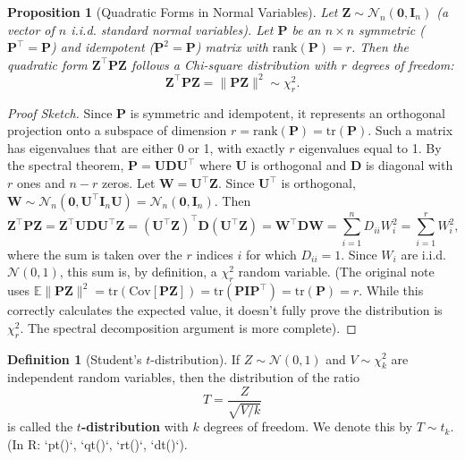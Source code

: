 \documentclass[11pt, letterpaper]{article}
\theoremstyle{plain} %
\newtheorem{proposition}[theorem]{Proposition}
\theoremstyle{definition} %
\newtheorem{definition}[theorem]{Definition}
\theoremstyle{remark} %
\renewcommand{\mathbf}{\boldsymbol} %
\newcommand{\E}{\mathbb{E}}
\newcommand{\Cov}{\mathrm{Cov}} %
\newcommand{\tr}{\mathrm{tr}}
\newcommand{\rank}{\mathrm{rank}}
\newcommand{\Normal}{\mathcal{N}}
\newcommand{\Chisq}{\chi^2}
\newcommand{\Tdist}{t}
\newcommand{\I}{\mathbf{I}} %
\begin{document}
\begin{proposition}[Quadratic Forms in Normal Variables] \label{prop:quadratic_form_chisq}
Let $\boldsymbol{Z} \sim \Normal_n(\mathbf{0}, \I_n)$ (a vector of $n$ i.i.d. standard normal variables). Let $\boldsymbol{P}$ be an $n \times n$ symmetric ($\boldsymbol{P}^{\top} = \boldsymbol{P}$) and idempotent ($\boldsymbol{P}^2 = \boldsymbol{P}$) matrix with $\rank(\boldsymbol{P}) = r$. Then the quadratic form $\boldsymbol{Z}^{\top}\boldsymbol{P}\boldsymbol{Z}$ follows a Chi-square distribution with $r$ degrees of freedom:
\[
\boldsymbol{Z}^{\top}\boldsymbol{P}\boldsymbol{Z} = \|\boldsymbol{P}\boldsymbol{Z}\|^2 \sim \Chisq_r.
\]
\end{proposition}
\begin{proof}[Proof Sketch]
Since $\boldsymbol{P}$ is symmetric and idempotent, it represents an orthogonal projection onto a subspace of dimension $r = \rank(\boldsymbol{P}) = \tr(\boldsymbol{P})$. Such a matrix has eigenvalues that are either 0 or 1, with exactly $r$ eigenvalues equal to 1. By the spectral theorem, $\boldsymbol{P} = \boldsymbol{U}\boldsymbol{D}\boldsymbol{U}^{\top}$ where $\boldsymbol{U}$ is orthogonal and $\boldsymbol{D}$ is diagonal with $r$ ones and $n-r$ zeros. Let $\boldsymbol{W} = \boldsymbol{U}^{\top}\boldsymbol{Z}$. Since $\boldsymbol{U}^{\top}$ is orthogonal, $\boldsymbol{W} \sim \Normal_n(\mathbf{0}, \boldsymbol{U}^{\top}\I_n \boldsymbol{U}) = \Normal_n(\mathbf{0}, \I_n)$. Then
\[
\boldsymbol{Z}^{\top}\boldsymbol{P}\boldsymbol{Z} = \boldsymbol{Z}^{\top}\boldsymbol{U}\boldsymbol{D}\boldsymbol{U}^{\top}\boldsymbol{Z} = (\boldsymbol{U}^{\top}\boldsymbol{Z})^{\top} \boldsymbol{D} (\boldsymbol{U}^{\top}\boldsymbol{Z}) = \boldsymbol{W}^{\top}\boldsymbol{D}\boldsymbol{W} = \sum_{i=1}^{n} D_{ii} W_i^2 = \sum_{i=1}^{r} W_i^2,
\]
where the sum is taken over the $r$ indices $i$ for which $D_{ii}=1$. Since $W_i$ are i.i.d. $\Normal(0, 1)$, this sum is, by definition, a $\Chisq_r$ random variable.
(The original note uses $\E\|\boldsymbol{P} \boldsymbol{Z}\|^2 = \tr(\Cov[\boldsymbol{P} \boldsymbol{Z}]) = \tr(\boldsymbol{P}\boldsymbol{I}\boldsymbol{P}^{\top}) = \tr(\boldsymbol{P}) = r$. While this correctly calculates the expected value, it doesn't fully prove the distribution is $\Chisq_r$. The spectral decomposition argument is more complete).
\end{proof}

\begin{definition}[Student's $t$-distribution] \label{def:t_dist}
If $Z \sim \Normal(0, 1)$ and $V \sim \Chisq_k$ are independent random variables, then the distribution of the ratio
\[
T = \frac{Z}{\sqrt{V/k}}
\]
is called the \textbf{$t$-distribution} with $k$ degrees of freedom. We denote this by $T \sim \Tdist_k$.
(In R: `pt()`, `qt()`, `rt()`, `dt()`).
\end{definition}
\end{document}
